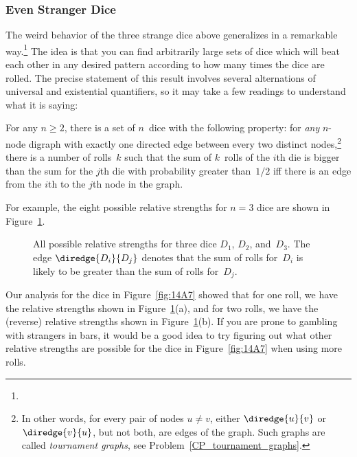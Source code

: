 \subsubsection{Even Stranger Dice}

The weird behavior of the three strange dice above generalizes in a
remarkable way.\footnote{}  The idea is
that you can find arbitrarily large sets of dice which will beat each
other in any desired pattern according to how many times the dice are
rolled.  The precise statement of this result involves several
alternations of universal and existential quantifiers, so it may take
a few readings to understand what it is saying:

\iffalse Now that we know that strange things can happen with strange
dice, it is natural, at least for mathematicians, to ask how strange
things can get.  It turns out that things can get very strange.  In
fact, mathematicians recently made the following discovery:\fi

\begin{theorem}\label{thm:14F2}
For any $n \ge 2$, there is a set of $n$~dice with the following
property: for \emph{any} $n$-node digraph with exactly one directed
edge between every two distinct nodes,\footnote{In other words, for
  every pair of nodes $u \neq v$, either $\diredge{u}{v}$ or
  $\diredge{v}{u}$, but not both, are edges of the graph.  Such graphs
  are called \emph{tournament graphs}, see
  Problem~\ref{CP_tournament_graphs}.} there is a number of rolls~$k$
such that the sum of $k$~rolls of the $i$th die is bigger than the sum
for the $j$th die with probability greater than~$1/2$ iff there is an
edge from the $i$th to the $j$th node in the graph.
\end{theorem}

For example, the eight possible relative strengths for $n =
3$ dice are shown in Figure~\ref{fig:14A13}.  

\begin{figure}


\caption{All possible relative strengths for three dice $D_1$, $D_2$,
  and~$D_3$.  The edge $\diredge{D_i}{D_j}$ denotes that the sum of
  rolls for~$D_i$ is likely to be greater than the sum of rolls
  for~$D_j$.}

\label{fig:14A13}

\end{figure}

Our analysis for the dice in Figure~\ref{fig:14A7} showed that for
one roll, we have the relative strengths shown in
Figure~\ref{fig:14A13}(a), and for two rolls, we have the (reverse)
relative strengths shown in Figure~\ref{fig:14A13}(b).  If you are
prone to gambling with strangers in bars, it would be a good idea to
try figuring out what other relative strengths are possible for the
dice in Figure~\ref{fig:14A7} when using more rolls.

